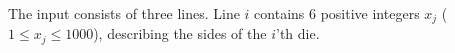 

The input consists of three lines. Line $i$ contains $6$ positive
integers $x_j$ ($1 \leq x_j \leq 1000$), describing the sides of the $i$'th die.

